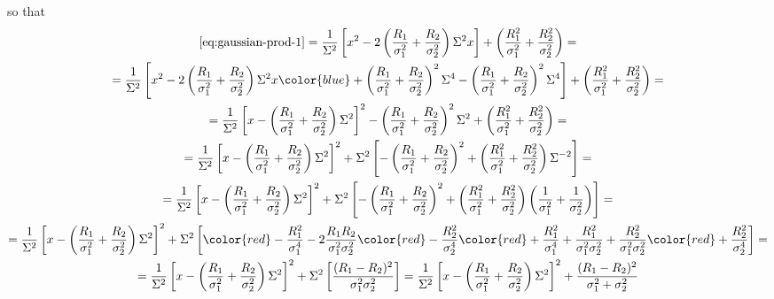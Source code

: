 \documentclass{article}
\begin{document}
\begin{appendices}
so that
\begin{equation} \label{eq:gaussian-prod-2}
\begin{gathered}
\eqref{eq:gaussian-prod-1} = \frac{1}{\Sigma^2}\left[x^2 - 2\left(\frac{R_1}{\sigma_1^2}+\frac{R_2}{\sigma_2^2}\right)\Sigma^2x\right]+\left(\frac{R_1^2}{\sigma_1^2}+\frac{R_2^2}{\sigma_2^2}\right) =\\
= \frac{1}{\Sigma^2}\left[x^2 - 2\left(\frac{R_1}{\sigma_1^2}+\frac{R_2}{\sigma_2^2}\right)\Sigma^2x {\color{blue}+ \left(\frac{R_1}{\sigma_1^2}+\frac{R_2}{\sigma_2^2}\right)^2\Sigma^4-\left(\frac{R_1}{\sigma_1^2}+\frac{R_2}{\sigma_2^2}\right)^2\Sigma^4}\right]+\left(\frac{R_1^2}{\sigma_1^2}+\frac{R_2^2}{\sigma_2^2}\right) = \\
= \frac{1}{\Sigma^2}\left[x - \left(\frac{R_1}{\sigma_1^2}+\frac{R_2}{\sigma_2^2}\right)\Sigma^2\right]^2 - \left(\frac{R_1}{\sigma_1^2}+\frac{R_2}{\sigma_2^2}\right)^2\Sigma^2 + \left(\frac{R_1^2}{\sigma_1^2}+\frac{R_2^2}{\sigma_2^2}\right) = \\
= \frac{1}{\Sigma^2}\left[x - \left(\frac{R_1}{\sigma_1^2}+\frac{R_2}{\sigma_2^2}\right)\Sigma^2\right]^2 + \Sigma^2\left[ - \left(\frac{R_1}{\sigma_1^2}+\frac{R_2}{\sigma_2^2}\right)^2 + \left(\frac{R_1^2}{\sigma_1^2}+\frac{R_2^2}{\sigma_2^2}\right) \Sigma^{-2}\right] = \\
= \frac{1}{\Sigma^2}\left[x - \left(\frac{R_1}{\sigma_1^2}+\frac{R_2}{\sigma_2^2}\right)\Sigma^2\right]^2 + \Sigma^2\left[ - \left(\frac{R_1}{\sigma_1^2}+\frac{R_2}{\sigma_2^2}\right)^2 + \left(\frac{R_1^2}{\sigma_1^2}+\frac{R_2^2}{\sigma_2^2}\right) \left(\frac{1}{\sigma_1^2} + \frac{1}{\sigma_2^2}\right)\right] = \\
= \frac{1}{\Sigma^2}\left[x - \left(\frac{R_1}{\sigma_1^2}+\frac{R_2}{\sigma_2^2}\right)\Sigma^2\right]^2 + \Sigma^2\left[{\color{red}-\frac{R_1^2}{\sigma_1^4}}-2\frac{R_1R_2}{\sigma_1^2\sigma_2^2}{\color{red}-\frac{R_2^2}{\sigma_2^4}} {\color{red}+\frac{R_1^2}{\sigma_1^4}} + \frac{R_1^2}{\sigma_1^2\sigma_2^2} + \frac{R_2^2}{\sigma_1^2\sigma_2^2}{\color{red}+\frac{R_2^2}{\sigma_2^4}}\right] = \\
= \frac{1}{\Sigma^2}\left[x - \left(\frac{R_1}{\sigma_1^2}+\frac{R_2}{\sigma_2^2}\right)\Sigma^2\right]^2 + \Sigma^2\left[\frac{(R_1-R_2)^2}{\sigma_1^2\sigma_2^2}\right] =
\frac{1}{\Sigma^2}\left[x - \left(\frac{R_1}{\sigma_1^2}+\frac{R_2}{\sigma_2^2}\right)\Sigma^2\right]^2 + \frac{(R_1-R_2)^2}{\sigma_1^2+\sigma_2^2}
\end{gathered}
\end{equation}


\end{appendices}
\end{document}
